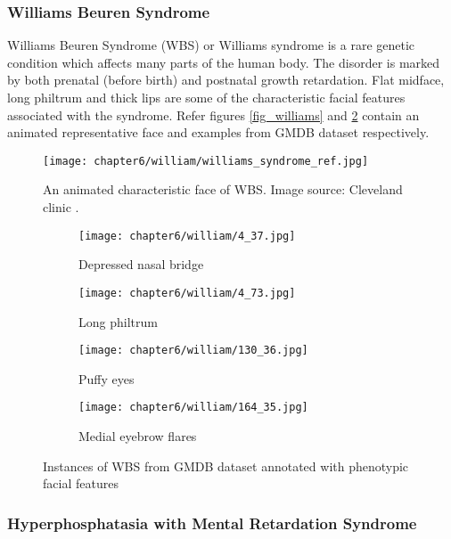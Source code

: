 \documentclass[../report.tex]{subfiles}
\begin{document}
	\subsubsection{Williams Beuren Syndrome}
	Williams Beuren Syndrome (WBS) or Williams syndrome is a rare genetic condition which affects many parts of the human body. The disorder is marked by both prenatal (before birth) and postnatal growth retardation. Flat midface, long philtrum and thick lips are some of the characteristic facial features associated with the syndrome. Refer figures \ref{fig_williams} and \ref{fig_wil_gmdb} contain an animated representative face and examples from GMDB dataset respectively. 
	\begin{figure}[H]\label{fig_williams_char}
	\centering
	\texttt{[image: chapter6/william/williams\_syndrome\_ref.jpg]}	
	\caption[An animated characteristic face of WBS]{An animated characteristic face of WBS. Image source: Cleveland clinic \protect\footnotemark.} 
	\end{figure}
	\begin{figure}[H]\label{fig_williams}
		\centering
		\begin{subfigure}[t]{0.24\textwidth}
			\centering
			\texttt{[image: chapter6/william/4\_37.jpg]}
			\caption{Depressed nasal bridge}
		\end{subfigure}
		\begin{subfigure}[t]{0.24\textwidth}
			\centering
			\texttt{[image: chapter6/william/4\_73.jpg]}
			\caption{Long philtrum}
		\end{subfigure}	
			\begin{subfigure}[t]{0.24\textwidth}
			\centering
			\texttt{[image: chapter6/william/130\_36.jpg]}
			\caption{Puffy eyes}
		\end{subfigure}	
			\begin{subfigure}[t]{0.24\textwidth}
			\centering
			\texttt{[image: chapter6/william/164\_35.jpg]}
			\caption{Medial eyebrow flares}
		\end{subfigure}	
	\caption[Instances of WBS from GMDB dataset]{Instances of WBS from GMDB dataset annotated with phenotypic facial features}
	\label{fig_wil_gmdb}
	\end{figure}





	\subsubsection{Hyperphosphatasia with Mental Retardation Syndrome}
	 
\end{document}
